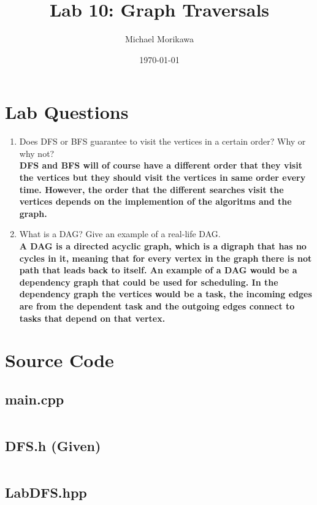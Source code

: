 \documentclass{article}
\title{Lab 10: Graph Traversals}
\author{Michael Morikawa}
\date{\today}
\begin{document}
\maketitle
\section{Lab Questions}
\begin{enumerate}[label=\textbf{Question \arabic*}]
    \item Does DFS or BFS guarantee to visit the vertices in a certain order?
          Why or why not? \\
          \textbf{
              DFS and BFS will of course have a different order that they visit
              the vertices but they should visit the vertices in same order every time.
              However, the order that the different searches visit the vertices depends on
              the implemention of the algoritms and the graph.
          }
    \item What is a DAG? Give an example of a real-life DAG.\\
          \textbf{
              A DAG is a directed acyclic graph, which is a digraph that has no cycles in it,
              meaning that for every vertex in the graph there is not path that leads back to
              itself. An example of a DAG would be a dependency graph that could be used for
              scheduling. In the dependency graph the vertices would be a task, the incoming edges
              are from the dependent task and the outgoing edges connect to tasks that depend on that
              vertex.
          }


\end{enumerate}

\section{Source Code}

\subsection{main.cpp}
\inputminted{c++}{../src/main.cpp}

\subsection{DFS.h (Given)}
\inputminted{c++}{../include/DFS.h}

\subsection{LabDFS.hpp}
\inputminted{c++}{../include/LabDFS.hpp}
\end{document}
